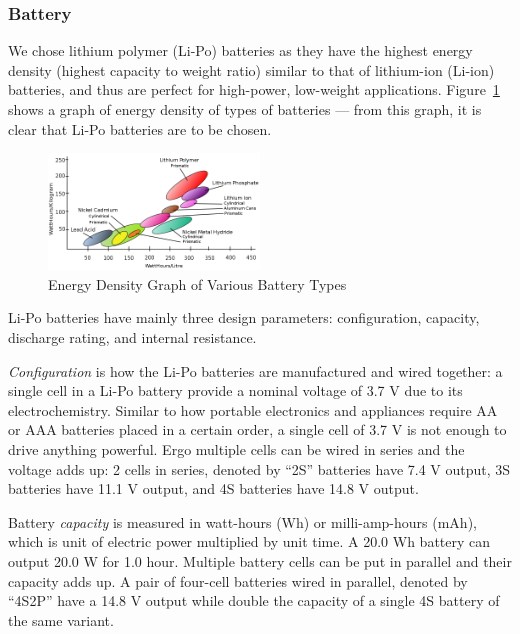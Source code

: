 \subsubsection{Battery}

We chose lithium polymer (Li-Po) batteries as they have the highest energy density (highest capacity to weight ratio) similar to that of lithium-ion (Li-ion) batteries, and thus are perfect for high-power, low-weight applications. Figure~\ref{fig:batterytypes} shows a graph of energy density of types of batteries \cite{battery} --- from this graph, it is clear that Li-Po batteries are to be chosen.

\begin{figure}[h]
    \centering
    \includegraphics[width=0.5\textwidth]{img/energydensity.png}
    \caption{Energy Density Graph of Various Battery Types}
    \label{fig:batterytypes}
\end{figure}

Li-Po batteries have mainly three design parameters: configuration, capacity,  discharge rating, and internal resistance.

\textit{Configuration} is how the Li-Po batteries are manufactured and wired together: a single cell in a Li-Po battery provide a 
nominal voltage of 3.7 V due to its electrochemistry.
Similar to how portable electronics and appliances require AA or AAA batteries placed in a certain order, a single cell of 3.7 V is not enough to drive anything powerful. Ergo multiple cells can be wired in series and the 
voltage adds up: 2 cells in series, denoted by ``2S'' batteries have 7.4 V output, 3S batteries have 11.1 V output, and 4S batteries have 14.8 V output. 

Battery \textit{capacity} is measured in watt-hours (Wh) or milli-amp-hours (mAh), which is unit of electric power multiplied by unit time. A 20.0 Wh battery can output 20.0 W for 1.0 hour. Multiple battery cells can be put in parallel and their capacity adds up. A pair of four-cell batteries wired in parallel, denoted by ``4S2P'' have a 14.8 V output while double the capacity of a single 4S battery of the same variant.

